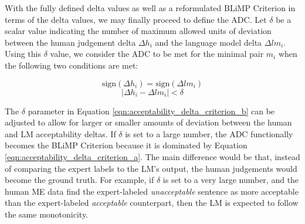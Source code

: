 With the fully defined delta values as well as a reformulated BLiMP Criterion in terms of the delta values, we may finally proceed to define the ADC.  Let $\delta$ be a scalar value indicating the number of maximum allowed units of deviation between the human judgement delta $\Delta h_i$ and the language model delta $\Delta lm_i$.  Using this $\delta$ value, we consider the ADC to be met for the minimal pair $m_i$ when the following two conditions are met:

\begin{equation}
    \mathrm{sign}(\Delta h_i) = \mathrm{sign}(\Delta lm_i)
    \label{eqn:acceptability_delta_criterion_a}
\end{equation}
\begin{equation}
    |\Delta h_i - \Delta lm_i| < \delta
    \label{eqn:acceptability_delta_criterion_b}
\end{equation}

The $\delta$ parameter in Equation \ref{eqn:acceptability_delta_criterion_b} can be adjusted to allow for larger or smaller amounts of deviation between the human and LM acceptability deltas.  If $\delta$ is set to a large number, the ADC functionally becomes the BLiMP Criterion because it is dominated by Equation \ref{eqn:acceptability_delta_criterion_a}.  The main difference would be that, instead of comparing the expert labels to the LM's output, the human judgements would become the ground truth.  For example, if $\delta$ is set to a very large number, and the human ME data find the expert-labeled \textit{unacceptable} sentence as more acceptable than the expert-labeled \textit{acceptable} counterpart, then the LM is expected to follow the same monotonicity.

